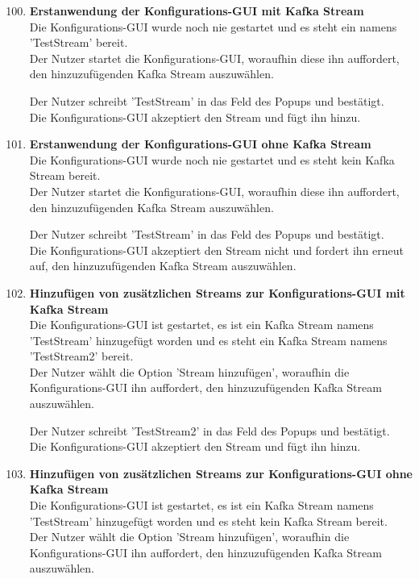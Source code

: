 \begin{enumerate}[label=\textbf{TI\arabic{enumi}0}]
	\setcounter{enumi}{99}
	
	\item \textbf{Erstanwendung der Konfigurations-GUI mit Kafka Stream}\\
		Die Konfigurations-GUI wurde noch nie gestartet und es steht ein   namens 'TestStream' bereit.\\
		Der Nutzer startet die Konfigurations-GUI, woraufhin diese ihn auffordert, den hinzuzufügenden Kafka Stream auszuwählen.\par
		
		Der Nutzer schreibt 'TestStream' in das Feld des Popups und bestätigt.\\
		Die Konfigurations-GUI akzeptiert den Stream und fügt ihn hinzu.
	\item \textbf{Erstanwendung der Konfigurations-GUI ohne Kafka Stream}\\
		Die Konfigurations-GUI wurde noch nie gestartet und es steht kein Kafka Stream bereit.\\
		Der Nutzer startet die Konfigurations-GUI, woraufhin diese ihn auffordert, den hinzuzufügenden Kafka Stream auszuwählen.\par
		
		Der Nutzer schreibt 'TestStream' in das Feld des Popups und bestätigt.\\
		Die Konfigurations-GUI akzeptiert den Stream nicht und fordert ihn erneut auf, den hinzuzufügenden Kafka Stream auszuwählen.
	\item \textbf{Hinzufügen von zusätzlichen Streams zur Konfigurations-GUI mit Kafka Stream}\\
		Die Konfigurations-GUI ist gestartet, es ist ein Kafka Stream namens 'TestStream' hinzugefügt worden und es steht ein Kafka Stream namens 'TestStream2' bereit.\\
		Der Nutzer wählt die Option 'Stream hinzufügen', woraufhin die Konfigurations-GUI ihn auffordert, den hinzuzufügenden Kafka Stream auszuwählen.\par
		
		Der Nutzer schreibt 'TestStream2' in das Feld des Popups und bestätigt.\\
		Die Konfigurations-GUI akzeptiert den Stream und fügt ihn hinzu.
	\item \textbf{Hinzufügen von zusätzlichen Streams zur Konfigurations-GUI ohne Kafka Stream}\\
		Die Konfigurations-GUI ist gestartet, es ist ein Kafka Stream namens 'TestStream' hinzugefügt worden und es steht kein Kafka Stream bereit.\\
		Der Nutzer wählt die Option 'Stream hinzufügen', woraufhin die Konfigurations-GUI ihn auffordert, den hinzuzufügenden Kafka Stream auszuwählen.\par
		

\end{enumerate}
